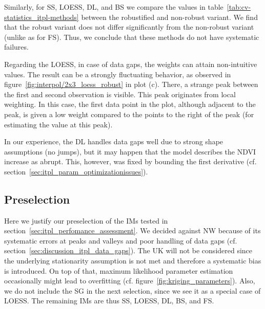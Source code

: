 {{        Similarly, for SS, LOESS, DL, and BS we compare the values in table~\ref{tab:cv-statistics_itpl-methods} between the robustified and non-robust variant. We find that the robust variant does not differ significantly from the non-robust variant (unlike as for FS). Thus, we conclude that these methods do not have systematic failures.

        Regarding the LOESS, in case of data gaps, the weights can attain non-intuitive values. The result can be a strongly fluctuating behavior, as observed in figure~\ref{fig:interpol/2x3_loess_robust} in plot (c). There, a strange peak between the first and second observation is visible. This peak originates from local weighting. In this case, the first data point in the plot, although adjacent to the peak, is given a low weight compared to the points to the right of the peak (for estimating the value at this peak).

        In our experience, the DL handles data gaps well due to strong shape assumptions (no jumps), but it may happen that the model describes the NDVI increase as abrupt. This, however, was fixed by bounding the first derivative (cf. section~\ref{sec:itpl_param_optimizationissues}).
    }

    \subsection{Preselection}{\label{sec:itpl_preselection}
        Here we justify our preselection of the {{IM}}s tested in section~\ref{sec:itpl_perfomance_assessment}. 
        We decided against NW because of its systematic errors at peaks and valleys and poor handling of data gaps (cf. section~\ref{sec:discussion_itpl_data_gaps}). 
        The UK will not be considered since the underlying stationarity assumption is not met and therefore a systematic bias is introduced. On top of that, maximum likelihood parameter estimation occasionally might lead to overfitting (cf. figure~\ref{fig:kriging_parameters}).
        Also, we do not include the SG in the next selection, since we see it as a special case of LOESS.
        The remaining IMs are thus SS, LOESS, DL, BS, and FS.
    }

}
